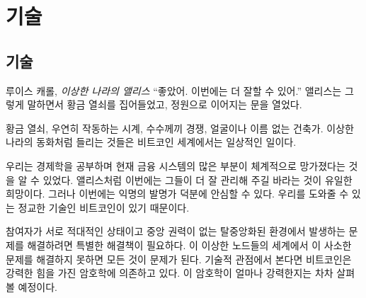 \part{기술}
\label{ch:technology}
\chapter*{기술}

\begin{comment}
	\begin{chapquote}{Lewis Carroll, \textit{Alice in Wonderland}}
		\enquote{Now, I'll manage better this time} she said to herself, and began by taking
		the little golden key, and unlocking the door that led into the garden
	\end{chapquote}
\end{comment}
\begin{chapquote}{루이스 캐롤, \textit{이상한 나라의 앨리스}}
	\enquote{좋았어. 이번에는 더 잘할 수 있어.} 앨리스는 그렇게 말하면서 황금 열쇠를 집어들었고, 
	정원으로 이어지는 문을 열었다.
\end{chapquote}

\begin{comment}
	Golden keys, clocks which only work by chance, races to solve
	strange riddles, and builders that don't have faces or names. What sounds like
	fairy tales from Wonderland is daily business in the world of Bitcoin.
\end{comment}
황금 열쇠, 우연히 작동하는 시계, 수수께끼 경쟁, 얼굴이나 이름 없는 건축가. 이상한 나라의 동화처럼 들리는
것들은 비트코인 세계에서는 일상적인 일이다.

\begin{comment}
	As we explored in Chapter~\ref{ch:economics}, large parts of the current financial system are systematically broken. Like Alice, we can only hope to manage better this time. But, thanks to a pseudonymous inventor, we have incredibly sophisticated technology to support us this time around: Bitcoin.
\end{comment}
우리는 경제학을 공부하며 현재 금융 시스템의 많은 부분이 체계적으로 망가졌다는 것을 알 수 있었다.
앨리스처럼 이번에는 그들이 더 잘 관리해 주길 바라는 것이 유일한 희망이다.
그러나 이번에는 익명의 발명가 덕분에 안심할 수 있다.
우리를 도와줄 수 있는 정교한 기술인 비트코인이 있기 때문이다.

\begin{comment}
	Solving problems in a radically decentralized and adversarial environment
	requires unique solutions. What would otherwise be trivial problems to solve
	are everything but in this strange world of nodes. Bitcoin relies on strong
	cryptography for most solutions, at least if looked at through the lens of
	technology. Just how strong this cryptography is will be explored in one of the
	following lessons.
\end{comment}
참여자가 서로 적대적인 상태이고 중앙 권력이 없는 탈중앙화된 환경에서 발생하는 문제를 해결하려면 특별한 해결책이 필요하다.
이 이상한 노드들의 세계에서 이 사소한 문제를 해결하지 못하면 모든 것이 문제가 된다.
기술적 관점에서 본다면 비트코인은 강력한 힘을 가진 암호학에 의존하고 있다. 
이 암호학이 얼마나 강력한지는 차차 살펴볼 예정이다.

